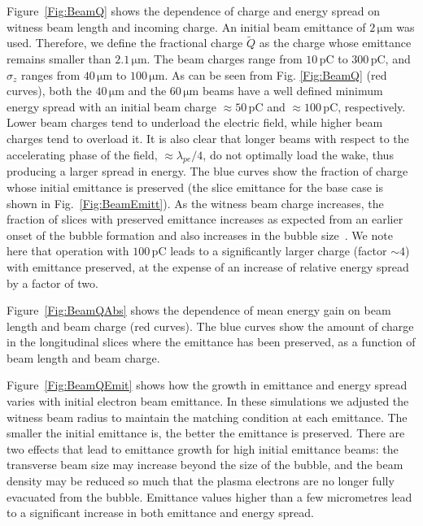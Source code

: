 \documentclass[aps,prstab,reprint,amsmath,amssymb,groupedaddress]{revtex4-1}
\newcommand{\unit}[1]{\,\mathrm{#1}}
\begin{document}
Figure~\ref{Fig:BeamQ} shows the dependence of charge and energy spread on witness beam length and incoming charge. An
initial beam emittance of $2\unit{\mu m}$ was used. Therefore, we define the fractional charge $\widetilde{Q}$ as the
charge whose emittance remains smaller than $2.1\unit{\mu m}$. The beam charges range from $10\unit{pC}$ to
$300\unit{pC}$, and $\sigma_{z}$ ranges from $40\unit{\mu m}$ to $100\unit{\mu m}$. As can be seen from Fig.
\ref{Fig:BeamQ} (red curves), both the $40\unit{\mu m}$ and the $60\unit{\mu m}$ beams have a well defined minimum
energy spread with an initial beam charge $\approx 50\unit{pC}$ and $\approx 100\unit{pC}$, respectively. Lower beam
charges tend to underload the electric field, while higher beam charges tend to overload it. It is also clear that
longer beams with respect to the accelerating phase of the field, $\approx\lambda_{pe}/4$, do not optimally load the
wake, thus producing a larger spread in energy. The blue curves show the fraction of charge whose initial emittance is
preserved (the slice emittance for the base case is shown in Fig.~\ref{Fig:BeamEmitt}). As the witness beam charge
increases, the fraction of slices with preserved emittance increases \textendash as expected from an earlier onset of
the bubble formation \textendash and also increases in the bubble size~\cite{lu:2006-1, lu:2006}. We note here that
operation with $100\unit{pC}$ leads to a significantly larger charge (factor $\sim 4$) with emittance preserved, at the
expense of an increase of relative energy spread by a factor of two.

Figure~\ref{Fig:BeamQAbs} shows the dependence of mean energy gain on beam length and beam charge (red curves). The blue
curves show the amount of charge in the longitudinal slices where the emittance has been preserved, as a function of
beam length and beam charge.

Figure~\ref{Fig:BeamQEmit} shows how the growth in emittance and energy spread varies with initial electron beam
emittance. In these simulations we adjusted the witness beam radius to maintain the matching condition at each
emittance. The smaller the initial emittance is, the better the emittance is preserved. There are two effects that lead
to emittance growth for high initial emittance beams: the transverse beam size may increase beyond the size of the
bubble, and the beam density may be reduced so much that the plasma electrons are no longer fully evacuated from the
bubble. Emittance values higher than a few micrometres lead to a significant increase in both emittance and energy
spread. 
\end{document}
